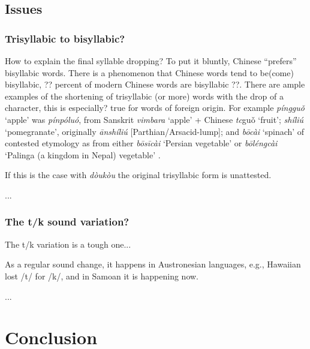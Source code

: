 \documentclass[12pt]{article}
\newcommand{\tc}[1]{\traditionalchinesefont{#1}\rmfamily}
\begin{document}
\subsection{Issues}

\subsubsection{Trisyllabic to bisyllabic?}

How to explain the final syllable dropping? To put it bluntly, Chinese ``prefers'' bisyllabic words. There is a phenomenon that Chinese words tend to be(come) bisyllabic, ?? percent of modern Chinese words are bisyllabic ??. There are ample examples of the shortening of trisyllabic (or more) words with the drop of a character, this is especially? true for words of foreign origin. For example \tc{蘋果} \textit{píngguǒ} `apple' was \tc{頻婆羅} \textit{pínpóluó}, from Sanskrit \textit{vimbara} `apple' + Chinese \textit{tc}{guǒ} `fruit'; \tc{石榴} \textit{shíliú} `pomegranate', originally \tc{安石榴} \textit{ānshíliú} [Parthian/Arsacid-lump]; and \tc{菠菜} \textit{bōcài} `spinach' of contested etymology as from either \tc{波斯菜} \textit{bōsīcài} `Persian vegetable' or \tc{波棱菜} \textit{bōléngcài} `Palinga (a kingdom in Nepal) vegetable' \parencite{shi_2021_loanwords}.

If this is the case with \textit{dòukòu} the original trisyllabic form is unattested.

...

\subsubsection{The t/k sound variation?}

The t/k variation is a tough one...

As a regular sound change, it happens in Austronesian languages, e.g., Hawaiian lost /t/ for /k/, and in Samoan it is happening now. 

...

\section{Conclusion}

\end{document}
